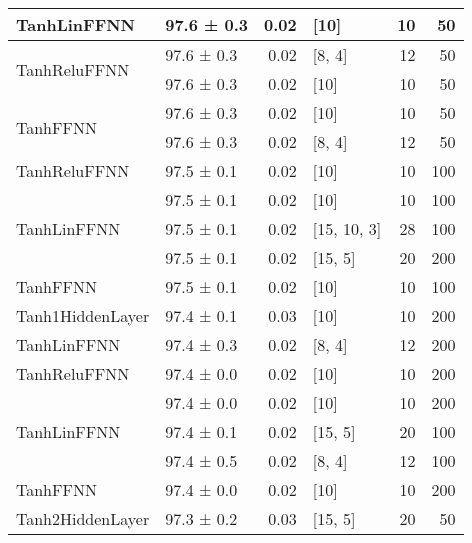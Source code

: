 \begin{longtable}{llrlrr}
 \hline
TanhLinFFNN                         & 97.6 ± 0.3  &  0.02 & [10]           &         10 &       50 \\
 \hline
\multirow{2}{*}{TanhReluFFNN}       & 97.6 ± 0.3  &  0.02 & [8, 4]         &         12 &       50 \\
                                            & 97.6 ± 0.3  &  0.02 & [10]           &         10 &       50 \\
 \hline
\multirow{2}{*}{TanhFFNN}           & 97.6 ± 0.3  &  0.02 & [10]           &         10 &       50 \\
                                            & 97.6 ± 0.3  &  0.02 & [8, 4]         &         12 &       50 \\
 \hline
TanhReluFFNN                        & 97.5 ± 0.1  &  0.02 & [10]           &         10 &      100 \\
 \hline
\multirow{3}{*}{TanhLinFFNN}        & 97.5 ± 0.1  &  0.02 & [10]           &         10 &      100 \\
                                            & 97.5 ± 0.1  &  0.02 & [15, 10, 3]    &         28 &      100 \\
                                            & 97.5 ± 0.1  &  0.02 & [15, 5]        &         20 &      200 \\
 \hline
TanhFFNN                            & 97.5 ± 0.1  &  0.02 & [10]           &         10 &      100 \\
 \hline
Tanh1HiddenLayer                    & 97.4 ± 0.1  &  0.03 & [10]           &         10 &      200 \\
 \hline
TanhLinFFNN                         & 97.4 ± 0.3  &  0.02 & [8, 4]         &         12 &      200 \\
 \hline
TanhReluFFNN                        & 97.4 ± 0.0  &  0.02 & [10]           &         10 &      200 \\
 \hline
\multirow{3}{*}{TanhLinFFNN}        & 97.4 ± 0.0  &  0.02 & [10]           &         10 &      200 \\
                                            & 97.4 ± 0.1  &  0.02 & [15, 5]        &         20 &      100 \\
                                            & 97.4 ± 0.5  &  0.02 & [8, 4]         &         12 &      100 \\
 \hline
TanhFFNN                            & 97.4 ± 0.0  &  0.02 & [10]           &         10 &      200 \\
 \hline
Tanh2HiddenLayer                    & 97.3 ± 0.2  &  0.03 & [15, 5]        &         20 &       50 \\

\end{longtable}
